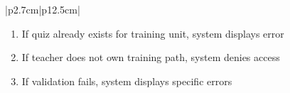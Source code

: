 \begin{table}[H]
\begin{tabular}{|p{2.7cm}|p{12.5cm}|}
\begin{minipage}[t]{\linewidth}
                                      \begin{enumerate}[topsep=0pt,itemsep=1pt,parsep=0pt,partopsep=0pt]
                                          \item If quiz already exists for training unit, system displays error
                                          \item If teacher does not own training path, system denies access
                                          \item If validation fails, system displays specific errors
                                      \end{enumerate}
                                  \end{minipage} \\
        \hline
    \end{tabular}
    \label{tab:teacher-create-quiz}
\end{table}
